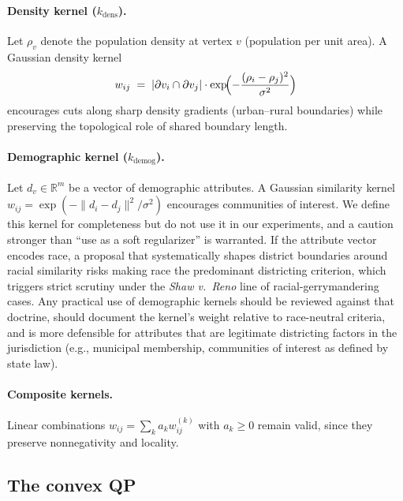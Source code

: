 \documentclass[11pt]{article}
\newcommand{\R}{\mathbb{R}}
\begin{document}
\paragraph{Density kernel ($k_{\mathrm{dens}}$).} Let $\rho_v$ denote
the population density at vertex $v$ (population per unit area). A
Gaussian density kernel
\[
  w_{ij} \;=\; |\partial v_i \cap \partial v_j| \cdot
  \exp\!\Bigl( -\frac{(\rho_i - \rho_j)^2}{\sigma^2} \Bigr)
\]
encourages cuts along sharp density gradients (urban--rural
boundaries) while preserving the topological role of shared boundary
length.

\paragraph{Demographic kernel ($k_{\mathrm{demog}}$).} Let
$d_v \in \R^m$ be a vector of demographic attributes. A Gaussian
similarity kernel $w_{ij} = \exp(-\|d_i - d_j\|^2 / \sigma^2)$
encourages communities of interest. We define this kernel for
completeness but do not use it in our experiments, and a caution
stronger than ``use as a soft regularizer'' is warranted. If the
attribute vector encodes race, a proposal that systematically shapes
district boundaries around racial similarity risks making race the
predominant districting criterion, which triggers strict scrutiny
under the \emph{Shaw v.\ Reno} line of racial-gerrymandering cases.
Any practical use of demographic kernels should be reviewed against
that doctrine, should document the kernel's weight relative to
race-neutral criteria, and is more defensible for attributes that are
legitimate districting factors in the jurisdiction (e.g., municipal
membership, communities of interest as defined by state law).

\paragraph{Composite kernels.} Linear combinations $w_{ij} = \sum_k a_k w_{ij}^{(k)}$
with $a_k \ge 0$ remain valid, since they preserve nonnegativity and locality.

\subsection{The convex QP}\label{sec:qp-model}
\end{document}
